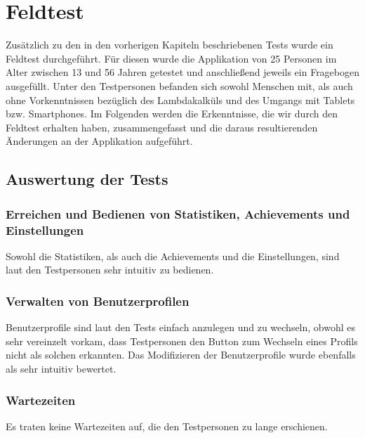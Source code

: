 \chapter{Feldtest}
Zusätzlich zu den in den vorherigen Kapiteln beschriebenen Tests wurde ein Feldtest durchgeführt.
Für diesen wurde die Applikation von 25 Personen im Alter zwischen 13 und 56 Jahren getestet und anschließend jeweils ein Fragebogen ausgefüllt.
Unter den Testpersonen befanden sich sowohl Menschen mit, als auch ohne Vorkenntnissen bezüglich des Lambdakalküls und des Umgangs mit Tablets bzw. Smartphones.
Im Folgenden werden die Erkenntnisse, die wir durch den Feldtest erhalten haben, zusammengefasst und die daraus resultierenden
Änderungen an der Applikation aufgeführt.

\section{Auswertung der Tests}
\subsection{Erreichen und Bedienen von Statistiken, Achievements und Einstellungen}
Sowohl die Statistiken, als auch die Achievements und die Einstellungen, sind laut den Testpersonen sehr intuitiv zu bedienen.

\subsection{Verwalten von Benutzerprofilen}
Benutzerprofile sind laut den Tests einfach anzulegen und zu wechseln, obwohl es sehr vereinzelt vorkam, dass Testpersonen den Button zum Wechseln eines Profils nicht als solchen erkannten.
Das Modifizieren der Benutzerprofile wurde ebenfalls als sehr intuitiv bewertet.

\subsection{Wartezeiten}
Es traten keine Wartezeiten auf, die den Testpersonen zu lange erschienen.

